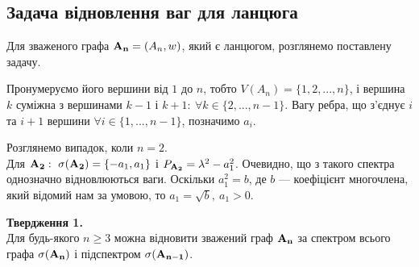\subsection{Задача відновлення ваг для ланцюга}
Для зваженого графа ${\bf A_n} = (A_n,w)$, який є ланцюгом, розглянемо поставлену задачу.

Пронумеруємо його вершини від $1$ до $n$, тобто $ V({A_n}) = \{ 1,2,...,n\} $, і вершина $k$ суміжна з вершинами $k-1$ і $k+1:\ \forall k \in \{2,...,n-1\}$. Вагу ребра, що з'єднує $i$ та $i+1$ вершини $\forall i \in \{1,...,n-1\}$, позначимо $a_i$. 

Розглянемо випадок, коли $n = 2$.\\
Для ${\bf A_2}:\ \sigma({\bf A_2}) = \{-a_1,a_1\}$ і $P_{\bf A_2} = \lambda^2
- a_1^2$. Очевидно, що з такого спектра однозначно відновлюються ваги. Оскільки $a_1^2 = b$, де $b$ --- коефіцієнт многочлена, який відомий нам за умовою, то $a_1 = \sqrt{b},\ a_1>0$.

\textbf{Твердження 1.\label{Tv1}}\\
Для будь-якого $n\geq3$ можна відновити зважений граф $\bf A_n$ за спектром всього графа $\sigma({\bf A_n})$ і підспектром $\sigma({\bf A_{n-1}})$.